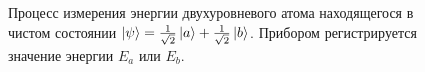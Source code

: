\begin{figure}
\centering



\caption{Процесс измерения энергии двухуровневого атома находящегося в
чистом состоянии $\left|\psi\right> = 
\frac{1}{\sqrt{2}}\ket{a} + \frac{1}{\sqrt{2}}\ket{b}$.
Прибором регистрируется значение энергии $E_a$ или $E_b$.
}
\label{fig:add:mesure_ex}
\end{figure}
